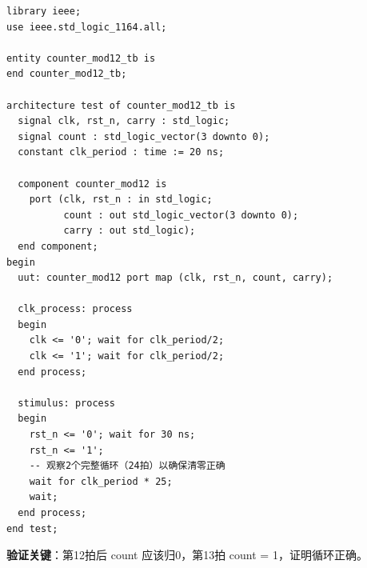 \begin{lstlisting}[caption={模12计数器Testbench——验证完整12拍循环}]
library ieee;
use ieee.std_logic_1164.all;

entity counter_mod12_tb is
end counter_mod12_tb;

architecture test of counter_mod12_tb is
  signal clk, rst_n, carry : std_logic;
  signal count : std_logic_vector(3 downto 0);
  constant clk_period : time := 20 ns;

  component counter_mod12 is
    port (clk, rst_n : in std_logic;
          count : out std_logic_vector(3 downto 0);
          carry : out std_logic);
  end component;
begin
  uut: counter_mod12 port map (clk, rst_n, count, carry);

  clk_process: process
  begin
    clk <= '0'; wait for clk_period/2;
    clk <= '1'; wait for clk_period/2;
  end process;

  stimulus: process
  begin
    rst_n <= '0'; wait for 30 ns;
    rst_n <= '1';
    -- 观察2个完整循环（24拍）以确保清零正确
    wait for clk_period * 25;
    wait;
  end process;
end test;
\end{lstlisting}

\textbf{验证关键}：第12拍后 count 应该归0，第13拍 count = 1，证明循环正确。
